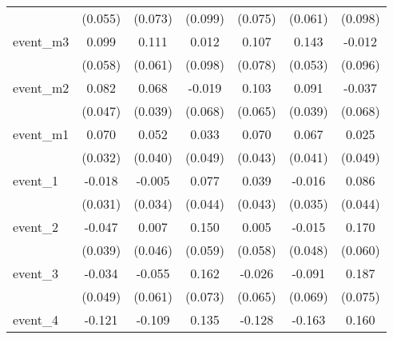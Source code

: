 {\begin{tabular}{l*{6}{c}}
            &     (0.055)         &     (0.073)         &     (0.099)         &     (0.075)         &     (0.061)         &     (0.098)         \\
[1em]
event\_m3    &       0.099         &       0.111         &       0.012         &       0.107         &       0.143\sym{**} &      -0.012         \\
            &     (0.058)         &     (0.061)         &     (0.098)         &     (0.078)         &     (0.053)         &     (0.096)         \\
[1em]
event\_m2    &       0.082         &       0.068         &      -0.019         &       0.103         &       0.091\sym{*}  &      -0.037         \\
            &     (0.047)         &     (0.039)         &     (0.068)         &     (0.065)         &     (0.039)         &     (0.068)         \\
[1em]
event\_m1    &       0.070\sym{*}  &       0.052         &       0.033         &       0.070         &       0.067         &       0.025         \\
            &     (0.032)         &     (0.040)         &     (0.049)         &     (0.043)         &     (0.041)         &     (0.049)         \\
[1em]
event\_1     &      -0.018         &      -0.005         &       0.077         &       0.039         &      -0.016         &       0.086         \\
            &     (0.031)         &     (0.034)         &     (0.044)         &     (0.043)         &     (0.035)         &     (0.044)         \\
[1em]
event\_2     &      -0.047         &       0.007         &       0.150\sym{*}  &       0.005         &      -0.015         &       0.170\sym{**} \\
            &     (0.039)         &     (0.046)         &     (0.059)         &     (0.058)         &     (0.048)         &     (0.060)         \\
[1em]
event\_3     &      -0.034         &      -0.055         &       0.162\sym{*}  &      -0.026         &      -0.091         &       0.187\sym{*}  \\
            &     (0.049)         &     (0.061)         &     (0.073)         &     (0.065)         &     (0.069)         &     (0.075)         \\
[1em]
event\_4     &      -0.121         &      -0.109         &       0.135         &      -0.128         &      -0.163\sym{*}  &       0.160\sym{*}  \\

\end{tabular}}
